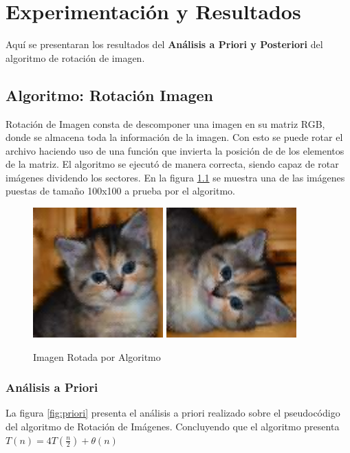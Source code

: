 \chapter{Experimentación y Resultados}
    Aquí se presentaran los resultados del \textbf{Análisis a Priori y Posteriori} del algoritmo de rotación de imagen. 
    
\section{Algoritmo: Rotación Imagen}
    Rotación de Imagen consta de descomponer una imagen en su matriz RGB, donde se almacena toda la información de la imagen. Con esto se puede rotar el archivo haciendo uso de una función que invierta la posición de de los elementos de la matriz. El algoritmo se ejecutó de manera correcta, siendo capaz de rotar imágenes dividendo los sectores. En la figura \ref{fig:imgrotadas} se muestra una de las imágenes puestas de tamaño 100x100 a prueba por el algoritmo.

    \begin{figure}[!h]
        \centering
        \includegraphics[width=5cm]{Images/Cat-test/orig100x100.png}\hfill
        \includegraphics[width=5cm]{Images/Cat-test/result100x100.png}\hfill
        \caption{Imagen Rotada por Algoritmo}
        \label{fig:imgrotadas}
    \end{figure}

    \newpage
    \subsection{Análisis a Priori}
        La figura \ref{fig:priori} presenta el análisis a priori realizado sobre el pseudocódigo del algoritmo de Rotación de Imágenes. Concluyendo que el algoritmo presenta \(T(n) = 4T(\frac{n}{2}) + \theta(n)\)
        
